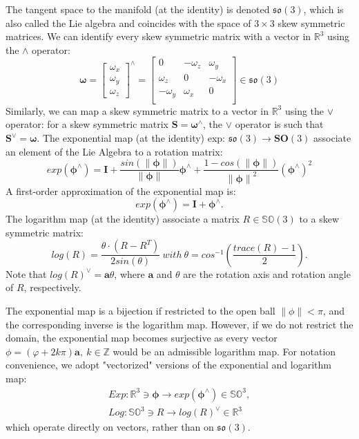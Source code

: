 \documentclass[a4paper]{report}
\begin{document}
The tangent space to the manifold (at the identity) is denoted $\mathfrak{so}(3)$, which is also called the Lie algebra and coincides with the space of $3 \times 3$ skew symmetric matrices. We can identify every skew symmetric matrix with a vector in $\mathbb{R}^3$ using the $\land$ operator:
\begin{equation}
\bm{\omega}=
\left[
\begin{matrix}
{\omega}_x \\ 
{\omega}_y \\ 
{\omega}_z
\end{matrix}
\right]^{\land}
=\left[
\begin{matrix}
0 & -\omega_z & \omega_y \\
\omega_z & 0 & -\omega_x \\ 
-\omega_y & \omega_x & 0 \\
\end{matrix}
\right]
\in \mathfrak{so}(3)
\end{equation}
Similarly, we can map a skew symmetric matrix to a vector in $\mathbb{R}^3$ using the $\vee$ operator: for a skew symmetric matrix $\mathbf{S}=\bm{\omega}^{\land}$, the $\vee$ operator is such that $\mathbf{S}^{\vee}=\bm{\omega}$. The exponential map (at the identity) exp: $\mathfrak{so}(3) \to \mathbf{SO}(3)$ associate an element of the Lie Algebra to a rotation matrix:
\begin{equation}
exp(\bm{\phi}^{\land})=
\bm{I}+\frac{sin(\parallel \bm{\phi} \parallel)}{\parallel \bm{\phi} \parallel}\bm{\phi}^{\land}+\frac{1-cos(\parallel \bm{\phi} \parallel)}{{\parallel \bm{\phi} \parallel}^2
}(\bm{\phi^{\land}})^{2} 
\end{equation}
A first-order approximation of the exponential map is:
\begin{equation}
exp(\bm{\phi}^{\land})=\bm{I}+\bm{{\phi}^{\land}}.
\end{equation}
The logarithm map (at the identity) associate a matrix $R \in \mathbb{SO}(3)$ to a skew symmetric matrix:
\begin{equation}
log(R)=\frac{\theta \cdot (R-R^T)}{2sin(\theta)}\ with\ \theta=cos^{-1}(\frac{trace(R)-1}{2}).
\end{equation}
Note that $log(R)^\vee = \bm{a}\theta$, where $\bm{a}$ and $\theta$ are the rotation axis and rotation angle of $R$, respectively.

The exponential map is a bijection if restricted to the open ball $\parallel\phi\parallel < \pi$, and the corresponding inverse is the logarithm map. However, if we do not restrict the domain, the exponential map becomes surjective as every vector $\phi = (\varphi+2k\pi)\bm{a},\ k \in \mathbb{Z}$ would be an admissible logarithm map.
For notation convenience, we adopt "vectorized" versions of the exponential and logarithm map:
\begin{equation}
\left.
\begin{matrix}
Exp: \mathbb{R}^3 \ni \bm{\phi} \to exp(\bm{\phi}^{\land}) \in \mathbb{SO}^3, \\
Log: \mathbb{SO}^3 \ni R \to log(R)^{\vee} \in \mathbb{R}^3
\end{matrix}
\right.
\end{equation}
which operate directly on vectors, rather than on $\mathfrak{so}(3)$.
\end{document}
